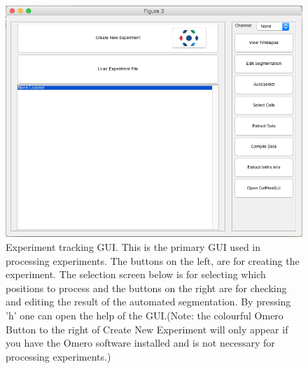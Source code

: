 \begin{figure}
\centering
\includegraphics[width=0.5\linewidth]{documentation_images/experimentTrackingGUI}
\caption[Experiment tracking GUI]{Experiment tracking GUI. This is the primary GUI used in processing experiments. The buttons on the left, are for creating the experiment. The selection screen below is for selecting which positions to process and the buttons on the right are for checking and editing the result of the automated segmentation. By pressing 'h' one can open the help of the GUI.(Note: the colourful Omero Button to the right of Create New Experiment will only appear if you have the Omero software installed and is not necessary for processing experiments.)}
\label{fig:experimentTrackingGUI}
\end{figure}


